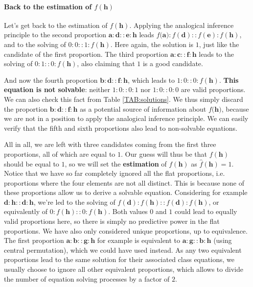 \paragraph{Back to the estimation of $f(\mathbf{h})$\\}

Let's get back to the estimation of $f(\mathbf{h})$. Applying the analogical
inference principle to the second proportion $\mathbf{a} : \mathbf{d} ::
\mathbf{e} : \mathbf{h}$ leads $f(\mathbf{a)} : f(\mathbf{d}) :: f(\mathbf{e})
: f(\mathbf{h})$, and to the solving of $0:0::1:f(\mathbf{h})$. Here again, the
solution is $1$, just like the candidate of the first proportion.
The third proportion  $\mathbf{a} : \mathbf{c} :: \mathbf{f} : \mathbf{h}$
leads to the solving of $0:1::0:f(\mathbf{h})$, also claiming that $1$ is a good candidate.

And now the fourth proportion $\mathbf{b} : \mathbf{d} :: \mathbf{f} :
\mathbf{h}$, which leads to $1:0::0:f(\mathbf{h})$. \textbf{This equation is not
solvable}: neither $1:0::0:1$ nor $1:0::0:0$ are valid proportions. We can also
check this fact from Table \ref{TAB:solutions}. We thus
simply discard the proportion $\mathbf{b} : \mathbf{d} :: \mathbf{f} :
\mathbf{h}$ as a potential source of information about $f(\mathbf{h)}$, because
we are not in a position to apply the analogical inference principle. We can
easily verify that the fifth and sixth proportions also lead to non-solvable
equations.

All in all, we are left with three candidates coming from the first three
proportions, all of which are equal to $1$. Our guess will thus be that
$f(\mathbf{h})$ should be equal to $1$, so we will set the \textbf{estimation} of
$f(\mathbf{h})$ as $\hat{f}(\mathbf{h}) = 1$.
Notice that we have so far completely ignored  all the flat proportions,
i.e. proportions where the four elements are not all distinct.
This is because none of these proportions allow us to derive a solvable
equation. Considering for example $\mathbf{d} : \mathbf{h} :: \mathbf{d} :
\mathbf{h}$, we're led to the solving of $f(\mathbf{d}) : f(\mathbf{h}) ::
f(\mathbf{d}) : f(\mathbf{h})$, or equivalently of $0 : f(\mathbf{h}) :: 0 :
f(\mathbf{h})$. Both values $0$ and $1$ could lead to equally valid proportions
here, so there is simply no predictive power in the flat proportions. We have
also only considered unique proportions, up to equivalence. The first proportion
$\mathbf{a} : \mathbf{b} :: \mathbf{g} : \mathbf{h}$ for example is equivalent
to $\mathbf{a} : \mathbf{g} :: \mathbf{b} : \mathbf{h}$ (using central
permutation), which we could have
used instead. As any two equivalent proportions lead to the same solution for
their associated class equations, we usually choose to ignore all other equivalent
proportions, which allows to divide the number of equation solving processes by
a factor of $2$.

